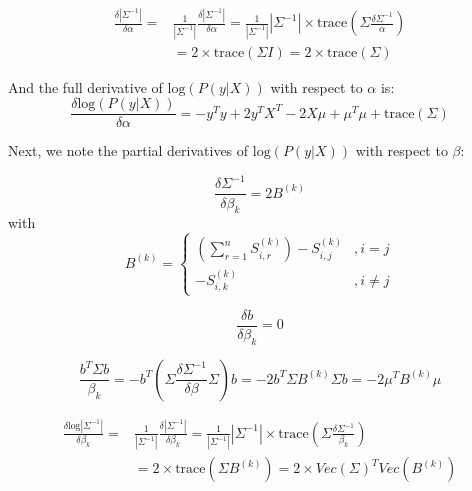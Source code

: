  \begin{equation}
 \begin{split}
 \frac{\delta | \Sigma^{-1} | }{\delta \alpha} = & \frac{1}{|\Sigma^{-1}|} \frac{\delta | \Sigma^{-1} |}{\delta \alpha} = \frac{1}{| \Sigma^{-1} |}| \Sigma^{-1} | \times \text{trace}(\Sigma \frac{\delta \Sigma^{-1}}{\alpha}) \\
 & = 2 \times \text{trace} (\Sigma I) = 2 \times \text{trace}(\Sigma)
 \end{split}
 \end{equation}

And the full derivative of $\text{log}(P(y|X))$ with respect to $\alpha$ is:
\begin{equation}
\frac{\delta\text{log}(P(y|X))}{\delta \alpha} = -y^Ty + 2y^T X^T - 2X \mu + \mu^T \mu + \text{trace}(\Sigma)
\end{equation}

Next, we note the partial derivatives of $\text{log}(P(y|X))$ with respect to $\beta$:

\begin{equation}
\frac{\delta \Sigma ^{-1}}{\delta \beta_k} = 2B^{(k)}
\end{equation}
with 
\begin{equation}
B^{(k)} = \begin{cases}
(\sum_{r=1}^{n} S_{i,r}^{(k)}) - S_{i,j}^{(k)} &,  i=j \\
-S_{i,k}^{(k)} & , i\neq j
\end{cases}
\end{equation}

\begin{equation}
\frac{\delta b}{\delta \beta_k} = 0
\end{equation}

\begin{equation}
\frac{b^T \Sigma b }{\beta_k} = -b^T (\Sigma \frac{\delta \Sigma^{-1}}{\delta \beta} \Sigma) b = -2b^T \Sigma B^{(k)} \Sigma b = -2 \mu^T B^{(k)} \mu
\end{equation}

\begin{equation}
\begin{split}
\frac{\delta\text{log} | \Sigma ^{-1} | }{\delta \beta_k} = & \frac{1}{|\Sigma^{-1}|} \frac{\delta | \Sigma ^{-1} | }{\delta \beta_k} =  \frac{1}{|\Sigma^{-1}|} | \Sigma^{-1} | \times \text{trace} (\Sigma \frac{\delta \Sigma^{-1}}{\beta_k}) \\
& = 2 \times \text{trace}(\Sigma B^{(k)}) = 2\times Vec(\Sigma)^T Vec(B^{(k)})
\end{split}
\end{equation}

